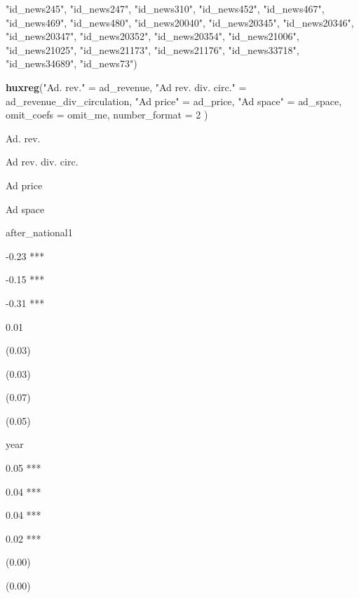 \documentclass[
]{book}
\newenvironment{Shaded}{\begin{snugshade}}{\end{snugshade}}
\newcommand{\DataTypeTok}[1]{\textcolor[rgb]{0.13,0.29,0.53}{#1}}
\newcommand{\DecValTok}[1]{\textcolor[rgb]{0.00,0.00,0.81}{#1}}
\newcommand{\KeywordTok}[1]{\textcolor[rgb]{0.13,0.29,0.53}{\textbf{#1}}}
\newcommand{\NormalTok}[1]{#1}
\newcommand{\StringTok}[1]{\textcolor[rgb]{0.31,0.60,0.02}{#1}}
\begin{document}
\begin{Shaded}
\begin{Highlighting}[]
             \StringTok{"id_news245"}\NormalTok{, }\StringTok{"id_news247"}\NormalTok{, }\StringTok{"id_news310"}\NormalTok{, }\StringTok{"id_news452"}\NormalTok{, }\StringTok{"id_news467"}\NormalTok{, }
             \StringTok{"id_news469"}\NormalTok{, }\StringTok{"id_news480"}\NormalTok{, }\StringTok{"id_news20040"}\NormalTok{, }\StringTok{"id_news20345"}\NormalTok{, }
             \StringTok{"id_news20346"}\NormalTok{, }\StringTok{"id_news20347"}\NormalTok{, }\StringTok{"id_news20352"}\NormalTok{, }\StringTok{"id_news20354"}\NormalTok{, }
             \StringTok{"id_news21006"}\NormalTok{, }\StringTok{"id_news21025"}\NormalTok{, }\StringTok{"id_news21173"}\NormalTok{, }\StringTok{"id_news21176"}\NormalTok{, }
             \StringTok{"id_news33718"}\NormalTok{, }\StringTok{"id_news34689"}\NormalTok{, }\StringTok{"id_news73"}\NormalTok{)}

\KeywordTok{huxreg}\NormalTok{(}\StringTok{"Ad. rev."}\NormalTok{ =}\StringTok{ }\NormalTok{ad_revenue, }
       \StringTok{"Ad rev. div. circ."}\NormalTok{ =}\StringTok{ }\NormalTok{ad_revenue_div_circulation, }
       \StringTok{"Ad price"}\NormalTok{ =}\StringTok{ }\NormalTok{ad_price, }
       \StringTok{"Ad space"}\NormalTok{ =}\StringTok{ }\NormalTok{ad_space,}
        \DataTypeTok{omit_coefs =}\NormalTok{ omit_me, }
        \DataTypeTok{number_format =} \DecValTok{2}
\NormalTok{        )}
\end{Highlighting}
\end{Shaded}

\label{tab:unnamed-chunk-383}

Ad. rev.

Ad rev. div. circ.

Ad price

Ad space

after\_national1

-0.23 ***

-0.15 ***

-0.31 ***

0.01~~~~

(0.03)~~~

(0.03)~~~

(0.07)~~~

(0.05)~~~

year

0.05 ***

0.04 ***

0.04 ***

0.02 ***

(0.00)~~~

(0.00)~~~
\end{document}
